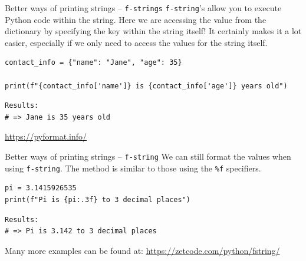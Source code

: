 \documentclass[10pt]{beamer}
\begin{document}
\begin{frame}[label={sec:org363b178},fragile]{Better ways of printing strings -- \texttt{f-strings}}
 \texttt{f-string}'s allow you to execute Python code within the string. Here we are accessing
the value from the dictionary by specifying the key within the string itself! It
certainly makes it a lot easier, especially if we only need to access the values for
the string itself.

\begin{verbatim}
contact_info = {"name": "Jane", "age": 35}

print(f"{contact_info['name']} is {contact_info['age']} years old")
\end{verbatim}

\begin{verbatim}
Results: 
# => Jane is 35 years old
\end{verbatim}


\url{https://pyformat.info/}
\end{frame}

\begin{frame}[label={sec:org524dc95},fragile]{Better ways of printing strings -- \texttt{f-string}}
 We can still format the values when using \texttt{f-string}. The method is similar to those
using the \texttt{\%f} specifiers.

\begin{verbatim}
pi = 3.1415926535
print(f"Pi is {pi:.3f} to 3 decimal places")
\end{verbatim}

\begin{verbatim}
Results: 
# => Pi is 3.142 to 3 decimal places
\end{verbatim}


Many more examples can be found at: \url{https://zetcode.com/python/fstring/}
\end{frame}
\end{document}
